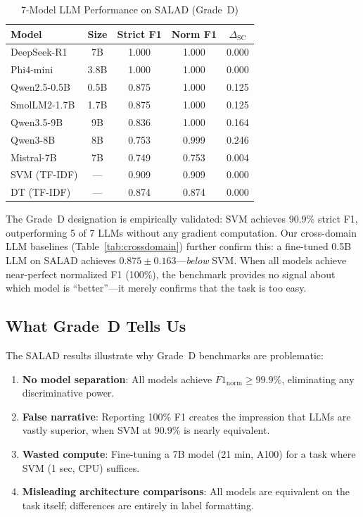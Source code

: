 \documentclass[journal]{IEEEtran}
\begin{document}
\begin{table}[!ht]
\centering
\caption{7-Model LLM Performance on SALAD (Grade~D)}
\label{tab:llmresults}
\begin{tabular}{lcccc}
\toprule
\textbf{Model} & \textbf{Size} & \textbf{Strict F1} & \textbf{Norm F1} & \textbf{$\Delta_\text{SC}$} \\
\midrule
DeepSeek-R1 & 7B & 1.000 & 1.000 & 0.000 \\
Phi4-mini & 3.8B & 1.000 & 1.000 & 0.000 \\
Qwen2.5-0.5B & 0.5B & 0.875 & 1.000 & 0.125 \\
SmolLM2-1.7B & 1.7B & 0.875 & 1.000 & 0.125 \\
Qwen3.5-9B & 9B & 0.836 & 1.000 & 0.164 \\
Qwen3-8B & 8B & 0.753 & 0.999 & 0.246 \\
Mistral-7B & 7B & 0.749 & 0.753 & 0.004 \\
\midrule
SVM (TF-IDF) & --- & 0.909 & 0.909 & 0.000 \\
DT (TF-IDF) & --- & 0.874 & 0.874 & 0.000 \\
\bottomrule
\end{tabular}
\end{table}

The Grade~D designation is empirically validated: SVM achieves 90.9\% strict F1, outperforming 5 of 7 LLMs without any gradient computation. Our cross-domain LLM baselines (Table~\ref{tab:crossdomain}) further confirm this: a fine-tuned 0.5B LLM on SALAD achieves $0.875 \pm 0.163$---\emph{below} SVM. When all models achieve near-perfect normalized F1 (100\%), the benchmark provides no signal about which model is ``better''---it merely confirms that the task is too easy.

\subsection{What Grade~D Tells Us}
The SALAD results illustrate why Grade~D benchmarks are problematic:
\begin{enumerate}
\item \textbf{No model separation}: All models achieve $F1_\text{norm} \geq 99.9\%$, eliminating any discriminative power.
\item \textbf{False narrative}: Reporting 100\% F1 creates the impression that LLMs are vastly superior, when SVM at 90.9\% is nearly equivalent.
\item \textbf{Wasted compute}: Fine-tuning a 7B model (21 min, A100) for a task where SVM (1 sec, CPU) suffices.
\item \textbf{Misleading architecture comparisons}: All models are equivalent on the task itself; differences are entirely in label formatting.
\end{enumerate}
\end{document}
